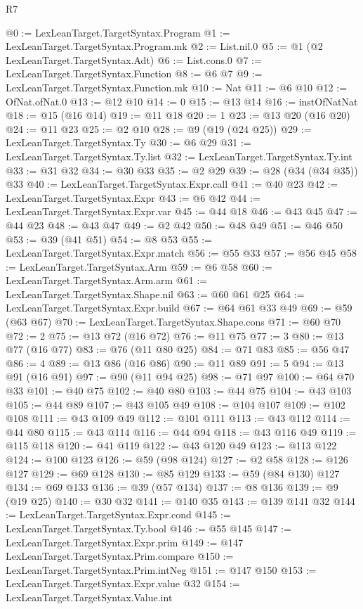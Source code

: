 \begin{lexlean}{R7}
\begin{coremodule}
@0 := LexLeanTarget.TargetSyntax.Program
@1 := LexLeanTarget.TargetSyntax.Program.mk
@2 := List.nil.{0}
@5 := @1 (@2 LexLeanTarget.TargetSyntax.Adt)
@6 := List.cons.{0}
@7 := LexLeanTarget.TargetSyntax.Function
@8 := @6 @7
@9 := LexLeanTarget.TargetSyntax.Function.mk
@10 := Nat
@11 := @6 @10
@12 := OfNat.ofNat.{0}
@13 := @12 @10
@14 := 0
@15 := @13 @14
@16 := instOfNatNat
@18 := @15 (@16 @14)
@19 := @11 @18
@20 := 1
@23 := @13 @20 (@16 @20)
@24 := @11 @23
@25 := @2 @10
@28 := @9 (@19 (@24 @25))
@29 := LexLeanTarget.TargetSyntax.Ty
@30 := @6 @29
@31 := LexLeanTarget.TargetSyntax.Ty.list
@32 := LexLeanTarget.TargetSyntax.Ty.int
@33 := @31 @32
@34 := @30 @33
@35 := @2 @29
@39 := @28 (@34 (@34 @35)) @33
@40 := LexLeanTarget.TargetSyntax.Expr.call
@41 := @40 @23
@42 := LexLeanTarget.TargetSyntax.Expr
@43 := @6 @42
@44 := LexLeanTarget.TargetSyntax.Expr.var
@45 := @44 @18
@46 := @43 @45
@47 := @44 @23
@48 := @43 @47
@49 := @2 @42
@50 := @48 @49
@51 := @46 @50
@53 := @39 (@41 @51)
@54 := @8 @53
@55 := LexLeanTarget.TargetSyntax.Expr.match
@56 := @55 @33
@57 := @56 @45
@58 := LexLeanTarget.TargetSyntax.Arm
@59 := @6 @58
@60 := LexLeanTarget.TargetSyntax.Arm.arm
@61 := LexLeanTarget.TargetSyntax.Shape.nil
@63 := @60 @61 @25
@64 := LexLeanTarget.TargetSyntax.Expr.build
@67 := @64 @61 @33 @49
@69 := @59 (@63 @67)
@70 := LexLeanTarget.TargetSyntax.Shape.cons
@71 := @60 @70
@72 := 2
@75 := @13 @72 (@16 @72)
@76 := @11 @75
@77 := 3
@80 := @13 @77 (@16 @77)
@83 := @76 (@11 @80 @25)
@84 := @71 @83
@85 := @56 @47
@86 := 4
@89 := @13 @86 (@16 @86)
@90 := @11 @89
@91 := 5
@94 := @13 @91 (@16 @91)
@97 := @90 (@11 @94 @25)
@98 := @71 @97
@100 := @64 @70 @33
@101 := @40 @75
@102 := @40 @80
@103 := @44 @75
@104 := @43 @103
@105 := @44 @89
@107 := @43 @105 @49
@108 := @104 @107
@109 := @102 @108
@111 := @43 @109 @49
@112 := @101 @111
@113 := @43 @112
@114 := @44 @80
@115 := @43 @114
@116 := @44 @94
@118 := @43 @116 @49
@119 := @115 @118
@120 := @41 @119
@122 := @43 @120 @49
@123 := @113 @122
@124 := @100 @123
@126 := @59 (@98 @124)
@127 := @2 @58
@128 := @126 @127
@129 := @69 @128
@130 := @85 @129
@133 := @59 (@84 @130) @127
@134 := @69 @133
@136 := @39 (@57 @134)
@137 := @8 @136
@139 := @9 (@19 @25)
@140 := @30 @32
@141 := @140 @35
@143 := @139 @141 @32
@144 := LexLeanTarget.TargetSyntax.Expr.cond
@145 := LexLeanTarget.TargetSyntax.Ty.bool
@146 := @55 @145
@147 := LexLeanTarget.TargetSyntax.Expr.prim
@149 := @147 LexLeanTarget.TargetSyntax.Prim.compare
@150 := LexLeanTarget.TargetSyntax.Prim.intNeg
@151 := @147 @150
@153 := LexLeanTarget.TargetSyntax.Expr.value @32
@154 := LexLeanTarget.TargetSyntax.Value.int

\end{coremodule}
\end{lexlean}
